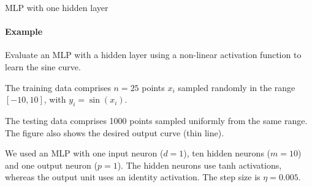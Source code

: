 %
\begin{frame}{MLP with one hidden layer}
\framesubtitle{Example}
	Evaluate an MLP with a hidden layer using a
    non-linear activation function to learn the sine curve.

	\medskip

	The training data %
	comprises $n=25$ points $x_i$ sampled randomly
    in the range $[-10,10]$, with $y_i = \sin(x_i)$. 

	\medskip

    The testing data comprises 1000 points sampled uniformly from 
    the same range.
    The figure also shows the desired output curve (thin line).
 

\medskip 
   We used an MLP with
    one input neuron ($d=1$),
    ten hidden neurons ($m=10$) and one output neuron ($p=1$). The hidden
    neurons use tanh activations, whereas the output unit
    uses an identity activation. The step size is $\eta=0.005$. 





\end{frame}
